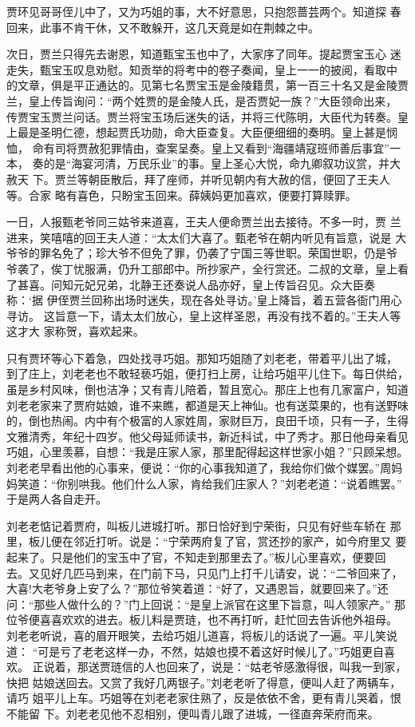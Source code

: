 贾环见哥哥侄儿中了，又为巧姐的事，大不好意思，只抱怨蔷芸两个。知道探
春回来，此事不肯干休，又不敢躲开，这几天竟是如在荆棘之中。

次日，贾兰只得先去谢恩，知道甄宝玉也中了，大家序了同年。提起贾宝玉心
迷走失，甄宝玉叹息劝慰。知贡举的将考中的卷子奏闻，皇上一一的披阅，看取中
的文章，俱是平正通达的。见第七名贾宝玉是金陵籍贯，第一百三十名又是金陵贾
兰，皇上传旨询问：“两个姓贾的是金陵人氏，是否贾妃一族？”大臣领命出来，
传贾宝玉贾兰问话。贾兰将宝玉场后迷失的话，并将三代陈明，大臣代为转奏。皇
上最是圣明仁德，想起贾氏功勋，命大臣查复。大臣便细细的奏明。皇上甚是悯恤，
命有司将贾赦犯罪情由，查案呈奏。皇上又看到“海疆靖寇班师善后事宜”一本，
奏的是“海宴河清，万民乐业”的事。皇上圣心大悦，命九卿叙功议赏，并大赦天
下。贾兰等朝臣散后，拜了座师，并听见朝内有大赦的信，便回了王夫人等。合家
略有喜色，只盼宝玉回来。薛姨妈更加喜欢，便要打算赎罪。

一日，人报甄老爷同三姑爷来道喜，王夫人便命贾兰出去接待。不多一时，贾
兰进来，笑嘻嘻的回王夫人道：“太太们大喜了。甄老爷在朝内听见有旨意，说是
大爷爷的罪名免了；珍大爷不但免了罪，仍袭了宁国三等世职。荣国世职，仍是爷
爷袭了，俟丁忧服满，仍升工部郎中。所抄家产，全行赏还。二叔的文章，皇上看
了甚喜。问知元妃兄弟，北静王还奏说人品亦好，皇上传旨召见。众大臣奏称：‘据
伊侄贾兰回称出场时迷失，现在各处寻访。’皇上降旨，着五营各衙门用心寻访。
这旨意一下，请太太们放心，皇上这样圣恩，再没有找不着的。”王夫人等这才大
家称贺，喜欢起来。

只有贾环等心下着急，四处找寻巧姐。那知巧姐随了刘老老，带着平儿出了城，
到了庄上，刘老老也不敢轻亵巧姐，便打扫上房，让给巧姐平儿住下。每日供给，
虽是乡村风味，倒也洁净；又有青儿陪着，暂且宽心。那庄上也有几家富户，知道
刘老老家来了贾府姑娘，谁不来瞧，都道是天上神仙。也有送菜果的，也有送野味
的，倒也热闹。内中有个极富的人家姓周，家财巨万，良田千顷，只有一子，生得
文雅清秀，年纪十四岁。他父母延师读书，新近科试，中了秀才。那日他母亲看见
巧姐，心里羡慕，自想：“我是庄家人家，那里配得起这样世家小姐？”只顾呆想。
刘老老早看出他的心事来，便说：“你的心事我知道了，我给你们做个媒罢。”周妈
妈笑道：“你别哄我。他们什么人家，肯给我们庄家人？”刘老老道：“说着瞧罢。”
于是两人各自走开。

刘老老惦记着贾府，叫板儿进城打听。那日恰好到宁荣街，只见有好些车轿在
那里，板儿便在邻近打听。说是：“宁荣两府复了官，赏还抄的家产，如今府里又
要起来了。只是他们的宝玉中了官，不知走到那里去了。”板儿心里喜欢，便要回
去。又见好几匹马到来，在门前下马，只见门上打千儿请安，说：“二爷回来了，
大喜!大老爷身上安了么？”那位爷笑着道：“好了，又遇恩旨，就要回来了。”还
问：“那些人做什么的？”门上回说：“是皇上派官在这里下旨意，叫人领家产。”
那位爷便喜喜欢欢的进去。板儿料是贾琏，也不再打听，赶忙回去告诉他外祖母。
刘老老听说，喜的眉开眼笑，去给巧姐儿道喜，将板儿的话说了一遍。平儿笑说道：
“可是亏了老老这样一办，不然，姑娘也摸不着这好时候儿了。”巧姐更自喜欢。
正说着，那送贾琏信的人也回来了，说是：“姑老爷感激得很，叫我一到家，快把
姑娘送回去。又赏了我好几两银子。”刘老老听了得意，便叫人赶了两辆车，请巧
姐平儿上车。巧姐等在刘老老家住熟了，反是依依不舍，更有青儿哭着，恨不能留
下。刘老老见他不忍相别，便叫青儿跟了进城，一径直奔荣府而来。

